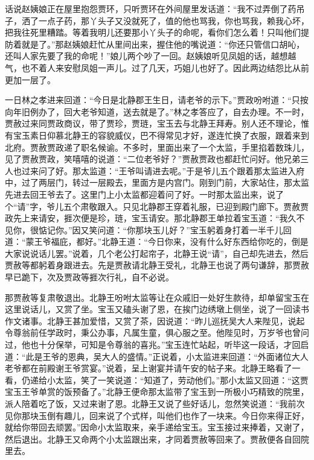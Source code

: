 


\begin{parag}
    话说赵姨娘正在屋里抱怨贾环，只听贾环在外间屋里发话道：“我不过弄倒了药吊子，洒了一点子药，那丫头子又没就死了，值的他也骂我，你也骂我，赖我心坏，把我往死里糟踏。等着我明儿还要那小丫头子的命呢，看你们怎么着！只叫他们提防着就是了。”那赵姨娘赶忙从里间出来，握住他的嘴说道：“你还只管信口胡吣，还叫人家先要了我的命呢！”娘儿两个吵了一回。赵姨娘听见凤姐的话，越想越气，也不着人来安慰凤姐一声儿。过了几天，巧姐儿也好了。因此两边结怨比从前更加一层了。
\end{parag}


\begin{parag}
    一日林之孝进来回道：“今日是北静郡王生日，请老爷的示下。”贾政吩咐道：“只按向年旧例办了，回大老爷知道，送去就是了。”林之孝答应了，自去办理。不一时，贾赦过来同贾政商议，带了贾珍，贾琏，宝玉去与北静王拜寿。别人还不理论，惟有宝玉素日仰慕北静王的容貌威仪，巴不得常见才好，遂连忙换了衣服，跟着来到北府。贾赦贾政递了职名候谕。不多时，里面出来了一个太监，手里掐着数珠儿，见了贾赦贾政，笑嘻嘻的说道：“二位老爷好？”贾赦贾政也都赶忙问好。他兄弟三人也过来问了好。那太监道：“王爷叫请进去呢。”于是爷儿五个跟着那太监进入府中，过了两层门，转过一层殿去，里面方是内宫门。刚到门前，大家站住，那太监先进去回王爷去了。这里门上小太监都迎着问了好。一时那太监出来，说了个“请”字，爷儿五个肃敬跟入。只见北静郡王穿着礼服，已迎到殿门廊下。贾赦贾政先上来请安，捱次便是珍，琏，宝玉请安。那北静郡王单拉着宝玉道：“我久不见你，很惦记你。”因又笑问道：“你那块玉儿好？”宝玉躬着身打着一半千儿回道：“蒙王爷福庇，都好。”北静王道：“今日你来，没有什么好东西给你吃的，倒是大家说说话儿罢。”说着，几个老公打起帘子，北静王说“请”，自己却先进去，然后贾赦等都躬着身跟进去。先是贾赦请北静王受礼，北静王也说了两句谦辞，那贾赦早已跪下，次及贾政等捱次行礼，自不必说。
\end{parag}


\begin{parag}
    那贾赦等复肃敬退出。北静王吩咐太监等让在众戚旧一处好生款待，却单留宝玉在这里说话儿，又赏了坐。宝玉又磕头谢了恩，在挨门边绣墩上侧坐，说了一回读书作文诸事。北静王甚加爱惜，又赏了茶，因说道：“昨儿巡抚吴大人来陛见，说起令尊翁前任学政时，秉公办事，凡属生童，俱心服之至。他陛见时，万岁爷也曾问过，他也十分保举，可知是令尊翁的喜兆。”宝玉连忙站起，听毕这一段话，才回启道：“此是王爷的恩典，吴大人的盛情。”正说着，小太监进来回道：“外面诸位大人老爷都在前殿谢王爷赏宴。”说着，呈上谢宴并请午安的帖子来。北静王略看了一看，仍递给小太监，笑了一笑说道：“知道了，劳动他们。”那小太监又回道：“这贾宝玉王爷单赏的饭预备了。”北静王便命那太监带了宝玉到一所极小巧精致的院里，派人陪着吃了饭，又过来谢了恩。北静王又说了些好话儿，忽然笑说道：“我前次见你那块玉倒有趣儿，回来说了个式样，叫他们也作了一块来。今日你来得正好，就给你带回去顽罢。”因命小太监取来，亲手递给宝玉。宝玉接过来捧着，又谢了，然后退出。北静王又命两个小太监跟出来，才同着贾赦等回来了。贾赦便各自回院里去。
\end{parag}


